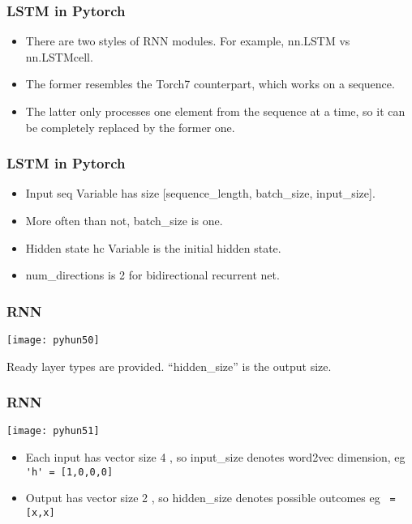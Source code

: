 \begin{frame}[fragile] \frametitle{LSTM in Pytorch}
\begin{itemize}
\item There are two styles of RNN modules. For example, nn.LSTM vs nn.LSTMcell. 
\item The former resembles the Torch7 counterpart, which works on a sequence. 
\item The latter only processes one element from the sequence at a time, so it can be completely replaced by the former one.
\end{itemize}

\end{frame}

\begin{frame}[fragile] \frametitle{LSTM in Pytorch}
\begin{itemize}
\item Input seq Variable has size [sequence\_length, batch\_size, input\_size].
\item More often than not, batch\_size is one.
\item Hidden state hc Variable is the initial hidden state.
\item num\_directions is 2 for bidirectional recurrent net.
\end{itemize}

\end{frame}

\begin{frame}[fragile] \frametitle{RNN}
\begin{center}
\texttt{[image: pyhun50]}
\end{center}
Ready layer types are provided. ``hidden\_size'' is the output size.
\end{frame}

\begin{frame}[fragile] \frametitle{RNN}
\begin{center}
\texttt{[image: pyhun51]}
\end{center}
\begin{itemize}
\item Each input has vector size 4 , so input\_size denotes word2vec dimension, eg \lstinline|'h' = [1,0,0,0]|
\item Output has vector size 2 , so hidden\_size denotes possible outcomes  eg \lstinline| = [x,x]|
\end{itemize}
\end{frame}


